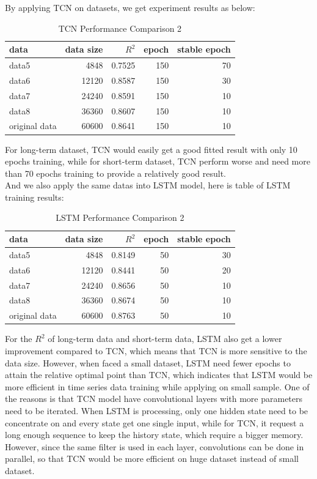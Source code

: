 By applying TCN on datasets, we get experiment results as below:
\begin{table}[H]
\centering
\caption{TCN Performance Comparison 2}
\begin{tabular}{l r r r r}
\toprule
\textbf{data}  & \textbf{data size}& \textbf{$R^2$} & \textbf{epoch}& \textbf{stable epoch}\\
\midrule
data5 & 4848 & 0.7525 & 150& 70\\
data6 & 12120 & 0.8587 & 150& 30 \\
data7 & 24240 & 0.8591 & 150& 10 \\
data8 & 36360 & 0.8607 & 150& 10 \\
original data & 60600 & 0.8641& 150& 10 \\
\bottomrule
\end{tabular}
\label{tab:TCN2}
\end{table}
For long-term dataset, TCN would easily get a good fitted result with only 10 epochs training, while for short-term dataset, TCN perform worse and need more than 70 epochs training to provide a relatively good result.\\
And we also apply the same datas into LSTM model, here is table of LSTM training results:
\begin{table}[H]
\centering
\caption{LSTM Performance Comparison 2}
\begin{tabular}{l r r r r}
\toprule
\textbf{data}  & \textbf{data size}& \textbf{$R^2$} & \textbf{epoch}& \textbf{stable epoch}\\
\midrule
data5 & 4848 & 0.8149 & 50& 30\\
data6 & 12120 & 0.8441 & 50& 20 \\
data7 & 24240 & 0.8656 & 50& 10 \\
data8 & 36360 & 0.8674 & 50& 10 \\
original data & 60600 & 0.8763& 50& 10 \\
\bottomrule
\end{tabular}
\label{tab:LSTM2}
\end{table}
For the $R^2$ of long-term data and short-term data, LSTM also get a lower improvement compared to TCN, which means that TCN is more sensitive to the data size. However, when faced a small dataset, LSTM need fewer epochs to attain the relative optimal point than TCN, which indicates that LSTM would be more efficient in time series data training while applying on small sample. One of the reasons is that TCN model have convolutional layers with more parameters need to be iterated. When LSTM is processing, only one hidden state need to be concentrate on and every state get one single input, while for TCN, it request a long enough sequence to keep the history state, which require a bigger memory. However, since the same filter is used in each layer, convolutions can be done in parallel, so that TCN would be more efficient on huge dataset instead of small dataset.

